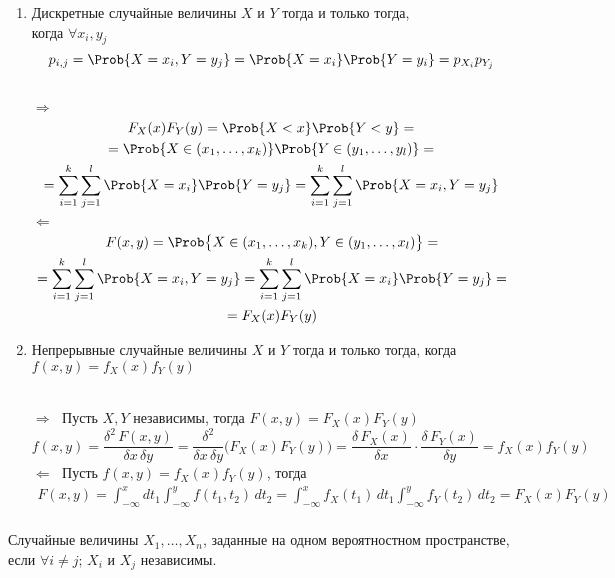 \begin{enumerate}
		\item Дискретные случайные величины $X$ и $Y$  тогда и только тогда,\\ когда $\forall x_i, y_j$
		\[
			p_{i, j} = \Prob\{ X = x_i, Y = y_j \} = \Prob\{X = x_i\} \Prob\{Y = y_i\} = p_{X_i} p_{Y_j}
		\]
		\begin{Proof}\\
			$\Rightarrow\;$
			\begin{multline*}
				F_X(x) F_Y(y) = \Prob\{ X < x \} \Prob\{ Y < y \} = \\
				= \Prob\{ X \in (x_1, \dots, x_k) \}\Prob\{ Y \in (y_1, \dots, y_l) \} = \\
				= \sum_{i = 1}^{k} \sum_{j = 1}^{l} \Prob\{ X = x_i \} \Prob\{Y = y_j\} = \sum_{i = 1}^{k} \sum_{j = 1}^{l} \Prob\{ X = x_i, Y = y_j \}
			\end{multline*}
			$\Leftarrow\;$
			\begin{multline*}
				F(x, y) = \Prob\bigl\{X \in (x_1, \dots, x_k), Y \in (y_1, \dots, x_l) \bigr\} = \\
				= \sum_{i = 1}^{k} \sum_{j = 1}^{l} \Prob\{X = x_i, Y = y_j\} = \sum_{i = 1}^{k} \sum_{j = 1}^{l} \Prob\{ X = x_i \} \Prob\{Y = y_j\} = \\
				= F_X(x) F_Y(y) 
			\end{multline*}
		\end{Proof}
		
		\item Непрерывные случайные величины $X$ и $Y$  тогда и только тогда, когда $f(x, y) = f_{X}(x)f_{Y}(y)$
		\begin{Proof}\\
			$\Rightarrow\;$ Пусть $X, Y$ независимы, тогда $F(x, y) = F_X(x)F_Y(y)$
			\[
				f(x, y) = \frac{\delta^2\,F(x, y)}{\delta x\, \delta y} = \frac{\delta^2}{\delta x\, \delta y} \biggl(F_X(x)F_Y(y) \biggr) = \frac{\delta\,F_X(x)}{\delta x}\cdot\frac{\delta\,F_Y(x)}{\delta y} = f_X(x)f_Y(y) 
			\]
			$\Leftarrow\;$ Пусть $f(x, y) = f_X(x)f_Y(y)$, тогда
			\begin{multline*}
				F(x, y) = \int_{-\infty}^{x}dt_1 \int_{-\infty}^{y} f(t_1, t_2)\,dt_2  = \int_{-\infty}^{x} f_X(t_1)\,dt_1 \int_{-\infty}^{y} f_Y(t_2)\,dt_2 = F_X(x)F_Y(y)\\
			\end{multline*}
		\end{Proof}
	\end{enumerate}

\begin{definition}
	Случайные величины $X_1, \dots, X_n$, заданные на одном вероятностном пространстве,  если $\forall i \neq j;\, X_i$ и $X_j$ независимы.
\end{definition}

